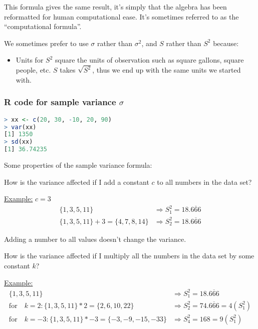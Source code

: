 \documentclass[../Notes.tex]{subfiles}
\begin{document}
    This formula gives the same result, it's simply that the algebra has been reformatted for human computational ease. It's sometimes referred to as the ``computational formula''.

    We sometimes prefer to use $\sigma$ rather than $\sigma^2$, and $S$ rather than $S^2$ because:

    \begin{itemize}
        \item Units for $S^2$ square the units of observation such as square gallons, square people, etc. $S$ takes $\sqrt{S^2}$, thus we end up with the same units we started with.
    \end{itemize}

    \subsubsection*{R code for sample variance $\sigma$}

    \begin{lstlisting}[language=R]
> xx <- c(20, 30, -10, 20, 90)
> var(xx)
[1] 1350
> sd(xx)
[1] 36.74235
    \end{lstlisting}

    Some properties of the sample variance formula:

    How is the variance affected if I add a constant $c$ to all numbers in the data set?

    \underline{Example:} $c = 3$
    \begin{align*}
        \{1,3,5,11\} & \Rightarrow S^{2}_{1} = 18.\overline{666}  \\
        \{1,3,5,11\} + 3 = \{4,7,8,14\} &\Rightarrow S^{2}_{2} = 18.\overline{666}
    \end{align*}

    Adding a number to all values doesn't change the variance.

    How is the variance affected if I multiply all the numbers in the data set by some constant $k$?

    \underline{Example:}
    \begin{align*}
        \{1,3,5,11\} & \Rightarrow S^{2}_{1} = 18.\overline{666}  \\
        \text{for} \quad k = 2: \{1,3,5,11\} * 2 = \{2,6,10,22\} &\Rightarrow S^{2}_{2} = 74.\overline{666} = 4(S^{2}_{1})  \\
        \text{for} \quad k = -3: \{1,3,5,11\} * -3 = \{-3,-9,-15,-33\} &\Rightarrow S^{2}_{4} = 168 = 9(S^{2}_{1})  \\
    \end{align*}
\end{document}
